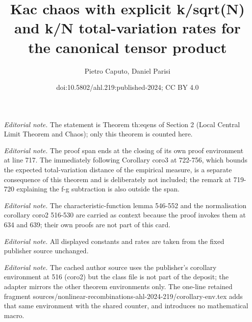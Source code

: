 \documentclass[10pt,a4paper]{article}
\title{Kac chaos with explicit k/sqrt(N) and k/N total-variation rates for the canonical tensor product}
\author{Pietro Caputo, Daniel Parisi}
\date{doi:10.5802/ahl.219:published-2024; CC BY 4.0}
\begin{document}
\maketitle
\noindent\textit{Editorial note.} The statement is Theorem th:eqens of Section 2 (Local Central Limit Theorem and Chaos); only this theorem is counted here.\par\medskip
\noindent\textit{Editorial note.} The proof span ends at the closing of its own proof environment at line 717. The immediately following Corollary coro3 at 722-756, which bounds the expected total-variation distance of the empirical measure, is a separate consequence of this theorem and is deliberately not included; the remark at 719-720 explaining the f-g subtraction is also outside the span.\par\medskip
\noindent\textit{Editorial note.} The characteristic-function lemma 546-552 and the normalisation corollary coro2 516-530 are carried as context because the proof invokes them at 634 and 639; their own proofs are not part of this card.\par\medskip
\noindent\textit{Editorial note.} All displayed constants and rates are taken from the fixed publisher source unchanged.\par\medskip
\noindent\textit{Editorial note.} The cached author source uses the publisher's corollary environment at 516 (coro2) but the class file is not part of the deposit; the adapter mirrors the other theorem environments only. The one-line retained fragment sources/nonlinear-recombinations-ahl-2024-219/corollary-env.tex adds that same environment with the shared counter, and introduces no mathematical macro.\par\medskip
\end{document}
